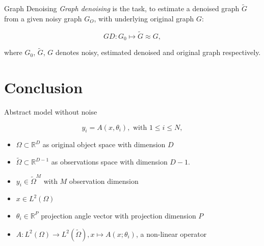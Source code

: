 \documentclass[aspectratio=169]{beamer}
\begin{document}
%
%

\begin{frame}[c]{Graph Denoising}
    \textit{Graph denoising} is the task, to estimate a denoised graph $\tilde{G}$  
    from a given noisy graph $G_O$, with underlying original graph $G$:

    \begin{definition}
        $$GD: G_0 \mapsto \tilde{G} \approx G,$$
    \end{definition}
    where $G_0$, $\tilde{G}$, $G$ denotes noisy, estimated denoised and original graph respectively.
   

\end{frame}

\section{Conclusion}

\begin{frame}[c]{Abstract model without noise}
    \begin{definition}
        $$y_i = A(x, \theta_i), \text{ with } 1 \leq i \leq N ,$$
    \end{definition}

    \begin{itemize}
        \item $\Omega \subset \mathbb{R}^D$ as original object space with dimension $D$
        \item $\tilde{\Omega} \subset \mathbb{R}^{D-1}$ as observations space with dimension $D-1$.
        \item $y_i \in \tilde{\Omega}^M$ with $M$ observation dimension
        \item $x \in L^2(\Omega)$
        \item $\theta_i \in \mathbb{R}^P$ projection angle vector with projection dimension $P$
        \item $A: L^2(\Omega) \to L^2(\tilde{\Omega}), x \mapsto A(x; \theta_i)$, a non-linear operator  
    \end{itemize}

\end{frame}
\end{document}
